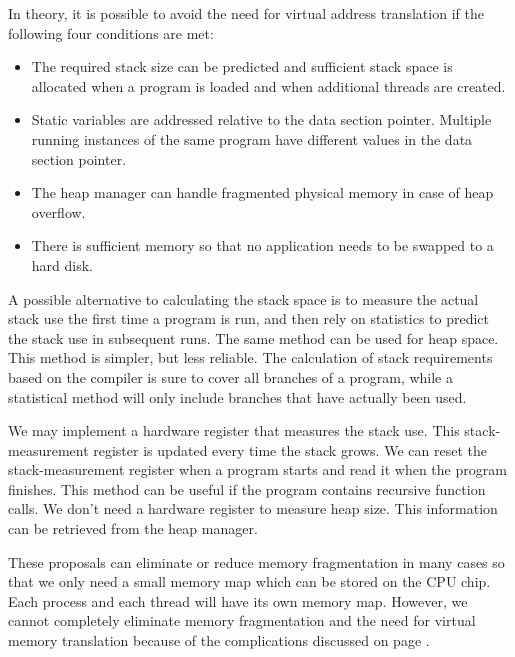 \documentclass[forwardcom.tex]{subfiles}
\begin{document}
In theory, it is possible to avoid the need for virtual address translation if the following four conditions are met: 

\begin{itemize}
\item The required stack size can be predicted and sufficient stack space is allocated when a 
program is loaded and when additional threads are created. 

\item Static variables are addressed relative to the data section pointer. Multiple running instances of the same program have different values in the data section pointer. 

\item The heap manager can handle fragmented physical memory in case of heap overflow. 

\item There is sufficient memory so that no application needs to be swapped to a hard disk.
\end{itemize}

A possible alternative to calculating the stack space is to measure the actual stack use the first time a program is run, and then rely on statistics to predict the stack use in subsequent runs. The same method can be used for heap space. This method is simpler, but less reliable. The calculation of stack requirements based on the compiler is sure to cover all branches of a program, while a statistical method will only include branches that have actually been used. 
\vspace{2mm}

We may implement a hardware register that measures the stack use. This stack-measurement register is updated every time the stack grows. We can reset the stack-measurement register when a program starts and read it when the program finishes. This method can be useful if the program contains recursive function calls. We don't need a hardware register to measure heap size. This information can be retrieved from the heap manager. 
\vspace{2mm}

These proposals can eliminate or reduce memory fragmentation in many cases so that we only need a small memory map which can be stored on the CPU chip. Each process and each thread will have its own memory map. However, we cannot completely eliminate memory fragmentation and the need for virtual memory translation because of the complications discussed on page \pageref{memoryManagement}.
\end{document}
